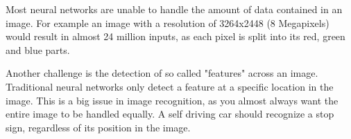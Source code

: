 Most neural networks are unable to handle the amount of data contained in an image.
For example an image with a resolution of 3264x2448 (8 Megapixels) would result in almost 24 million inputs, as each pixel is split into its red, green and blue parts.

Another challenge is the detection of so called "features" across an image. Traditional neural networks only detect a feature at a specific location in the image.
This is a big issue in image recognition, as you almost always want the entire image to be handled equally.
A self driving car should recognize a stop sign, regardless of its position in the image.
